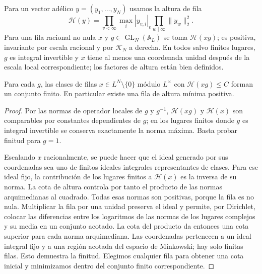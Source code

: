 Para un vector adélico $y=(y_1,\ldots,y_N)$ usamos la altura de fila
\begin{equation}
 \mathcal H(y)=\prod_{v<\infty}\max_i |y_{v,i}|_v
                 \prod_{w\mid\infty}\|y_w\|_2^2.
 \label{eq:ahr-row}
\end{equation}
Para una fila racional no nula $x$ y $g\in\operatorname{GL}_N(\mathbb A_L)$ se toma $\mathcal H(xg)$; es positiva, invariante por escala racional y por $\mathcal K_N$ a derecha. En todos salvo finitos lugares, $g$ es integral invertible y $x$ tiene al menos una coordenada unidad después de la escala local correspondiente; los factores de altura están bien definidos.

\begin{lema}
\label{lem:ahr-rowfinite}
Para cada $g$, las clases de filas $x\in L^N\setminus\{0\}$ módulo $L^\times$ con $\mathcal H(xg)\le C$ forman un conjunto finito. En particular existe una fila de altura mínima positiva.
\end{lema}
\begin{proof}
Por las normas de operador locales de $g$ y $g^{-1}$, $\mathcal H(xg)$ y $\mathcal H(x)$ son comparables por constantes dependientes de $g$; en los lugares finitos donde $g$ es integral invertible se conserva exactamente la norma máxima. Basta probar finitud para $g=1$.

Escalando $x$ racionalmente, se puede hacer que el ideal generado por sus coordenadas sea uno de finitos ideales integrales representantes de clases. Para ese ideal fijo, la contribución de los lugares finitos a $\mathcal H(x)$ es la inversa de su norma. La cota de altura controla por tanto el producto de las normas arquimedianas al cuadrado. Todas esas normas son positivas, porque la fila es no nula. Multiplicar la fila por una unidad preserva el ideal y permite, por Dirichlet, colocar las diferencias entre los logaritmos de las normas de los lugares complejos y su media en un conjunto acotado. La cota del producto da entonces una cota superior para cada norma arquimediana. Las coordenadas pertenecen a un ideal integral fijo y a una región acotada del espacio de Minkowski; hay solo finitas filas. Esto demuestra la finitud. Elegimos cualquier fila para obtener una cota inicial y minimizamos dentro del conjunto finito correspondiente.
\end{proof}

